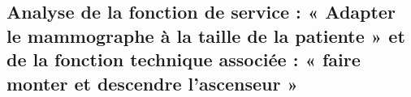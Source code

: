 %
%
%
%
%
%
%
%
%
%
%

\subsection*{Analyse de la fonction de service : « Adapter le mammographe à la taille de la patiente » et de la fonction technique associée : « faire monter et descendre l’ascenseur »}
\ifprof
\else



